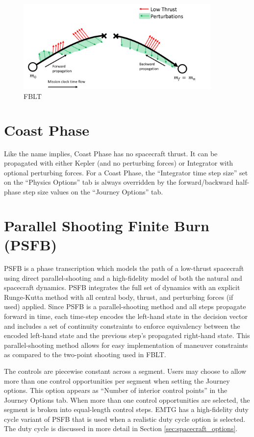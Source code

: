     \begin{figure}[H]
        \centering
        \includegraphics[width=0.9\textwidth]{../../shared_latex_inputs/images/fblt.png}
        \caption{\acf{FBLT}}
    \end{figure}

\section{Coast Phase}
\label{sec:coast_phase}

    Like the name implies, Coast Phase has no spacecraft thrust. It can be propagated with either Kepler (and no perturbing forces) or Integrator with optional perturbing forces. For a Coast Phase, the ``Integrator time step size'' set on the ``Physics Options'' tab is always overridden by the forward/backward half-phase step size values on the ``Journey Options'' tab. 


\section{Parallel Shooting Finite Burn (PSFB)}
\label{sec:parallel_shooting_finite_burn}
\ac{PSFB} is a phase transcription which models the path of a low-thrust spacecraft using direct parallel-shooting and a high-fidelity model of both the natural and spacecraft dynamics. \ac{PSFB} integrates the full set of dynamics with an explicit Runge-Kutta method with all central body, thrust, and perturbing forces (if used) applied. Since \ac{PSFB} is a parallel-shooting method and all steps propagate forward in time, each time-step encodes the left-hand state in the decision vector and includes a set of continuity constraints to enforce equivalency between the encoded left-hand state and the previous step's propagated right-hand state. This parallel-shooting method allows for easy implementation of maneuver constraints as compared to the two-point shooting used in \ac{FBLT}. 

\noindent The controls are piecewise constant across a segment. Users may choose to allow more than one control opportunities per segment when setting the Journey options. This option appears as ``Number of interior control points'' in the Journey Options tab. When more than one control opportunities are selected, the segment is broken into equal-length control steps. \ac{EMTG} has a high-fidelity duty cycle variant of \ac{PSFB} that is used when a realistic duty cycle option is selected. The duty cycle is discussed in more detail in Section \ref{sec:spacecraft_options}.


